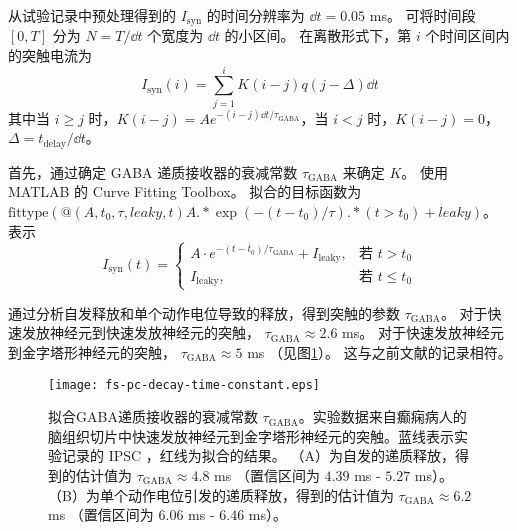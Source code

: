 从试验记录中预处理得到的 $I_\text{syn}$ 的时间分辨率为 $\dd{t} = 0.05$ ms。
可将时间段 $[0, T]$ 分为 $N = T/\dd{t}$ 个宽度为 $\dd{t}$ 的小区间。
在离散形式下，第 $i$ 个时间区间内的突触电流为
\begin{equation}
I_\text{syn}(i) = \sum_{j=1}^i K(i-j)q(j-\Delta)\dd{t}
\label{equation:synaptic-current-discrete-convolution} 
\end{equation}
其中当 $i \geq j$ 时，$K(i-j) = Ae^{-(i-j)\dd{t}/\tau_\text{GABA}}$，当 $i < j$ 时，$K(i-j) = 0$，$\Delta = t_\text{delay}/\dd{t}$。

首先，通过确定 GABA 递质接收器的衰减常数 $\tau_\text{GABA}$ 来确定 $K$。
使用 MATLAB 的 Curve Fitting Toolbox。
拟合的目标函数为 $\text{fittype}(@(A, t_0, \tau, leaky, t) A .* \exp(-(t-t_0)/\tau) .* (t > t_0) + leaky)$。
表示
\begin{equation}
I_\text{syn}(t) = 
\begin{cases}
A \cdot e^{-(t-t_0)/\tau_\text{GABA}} + I_\text{leaky}, & \text{若 } t > t_0 \\
I_\text{leaky}, & \text{若 } t \leq t_0
\end{cases}
\end{equation}

通过分析自发释放和单个动作电位导致的释放，得到突触的参数 $\tau_\text{GABA}$。
对于快速发放神经元到快速发放神经元的突触， $\tau_\text{GABA} \approx 2.6$ ms。
对于快速发放神经元到金字塔形神经元的突触， $\tau_\text{GABA} \approx 5$ ms （见图\ref{figure:decay-time-constant}）。
这与之前文献的记录相符\cite{Bartos2002}。

\begin{figure}
\centering
\texttt{[image: fs-pc-decay-time-constant.eps]}
\caption{拟合GABA递质接收器的衰减常数 $\tau_\text{GABA}$。实验数据来自癫痫病人的脑组织切片中快速发放神经元到金字塔形神经元的突触。蓝线表示实验记录的 IPSC ，红线为拟合的结果。
（A）为自发的递质释放，得到的估计值为 $\tau_\text{GABA} \approx 4.8$ ms （置信区间为 $4.39$ ms - $5.27$ ms）。
（B）为单个动作电位引发的递质释放，得到的估计值为 $\tau_\text{GABA} \approx 6.2$ ms （置信区间为 $6.06$ ms - $6.46$ ms）。}
\label{figure:decay-time-constant}
\end{figure}


